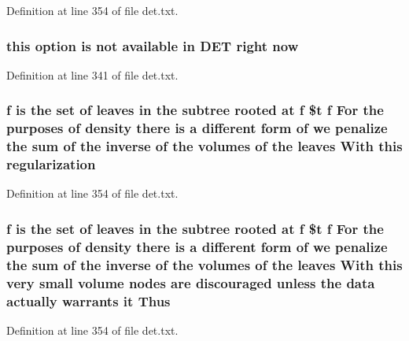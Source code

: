 Definition at line 354 of file det.\+txt.

\subsubsection[{now}]{\setlength{\rightskip}{0pt plus 5cm}this option is not available in D\+ET right now}\label{det_8txt_a1f596a62bceac17014e1dd335b8f3e10}


Definition at line 341 of file det.\+txt.

\subsubsection[{regularization}]{\setlength{\rightskip}{0pt plus 5cm}f is the {\bf set} of leaves in the subtree rooted at f \$t f For the purposes of density there is a different form of we penalize the sum of the inverse of the volumes of the leaves With this regularization}\label{det_8txt_a9cca165c3a05514453c6f5a747aa57ca}


Definition at line 354 of file det.\+txt.

\subsubsection[{Thus}]{\setlength{\rightskip}{0pt plus 5cm}f is the {\bf set} of leaves in the subtree rooted at f \$t f For the purposes of density there is a different form of we penalize the sum of the inverse of the volumes of the leaves With this very small volume nodes are discouraged unless the data actually warrants it Thus}\label{det_8txt_aab20f71ea7429d20011eee9f68ef7d1d}


Definition at line 354 of file det.\+txt.

